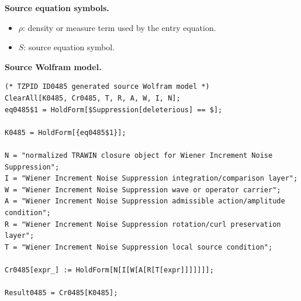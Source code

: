 \begin{minipage}[t]{0.49\linewidth}
\begingroup
\small
\raggedright
\textbf{Source equation symbols.}\par
\begin{itemize}[leftmargin=1.35em,itemsep=1pt,topsep=1pt,parsep=0pt]
    \item $\rho$: density or measure term used by the entry equation.
    \item $S$: source equation symbol.
\end{itemize}
\endgroup
\end{minipage}\hfill
\begin{minipage}[t]{0.47\linewidth}
\begingroup
\scriptsize
\raggedright
\textbf{Source Wolfram model.}\par
\begin{Verbatim}[fontsize=\tiny,breaklines=true,breakanywhere=true]
(* TZPID ID0485 generated source Wolfram model *)
ClearAll[K0485, Cr0485, T, R, A, W, I, N];
eq0485$1 = HoldForm[$Suppression[deleterious] == $];

K0485 = HoldForm[{eq0485$1}];

N = "normalized TRAWIN closure object for Wiener Increment Noise Suppression";
I = "Wiener Increment Noise Suppression integration/comparison layer";
W = "Wiener Increment Noise Suppression wave or operator carrier";
A = "Wiener Increment Noise Suppression admissible action/amplitude condition";
R = "Wiener Increment Noise Suppression rotation/curl preservation layer";
T = "Wiener Increment Noise Suppression local source condition";

Cr0485[expr_] := HoldForm[N[I[W[A[R[T[expr]]]]]]];

Result0485 = Cr0485[K0485];
\end{Verbatim}
\endgroup
\end{minipage}

